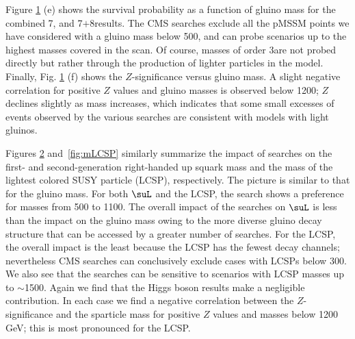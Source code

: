 \begin{figure}[t]
\vspace{1mm}
    \caption{}
    \label{fig:mg}
\end{figure}

Figure \ref{fig:mg} (e) shows the survival probability as a function of gluino mass
for the combined 7\TeV, and 7$+$8\TeV results. 
The CMS searches exclude all the pMSSM points we have considered with a gluino mass below 500\GeV, and can probe scenarios up to the highest masses covered in the scan.  Of course, masses of order 3\TeV are not probed directly but rather through the production of lighter particles in the model.   
Finally, Fig. \ref{fig:mg} (f) shows the $Z$-significance versus gluino mass.  A
slight negative correlation for positive $Z$ values and gluino masses
is observed below 1200\GeV; $Z$ declines slightly as mass
increases, which indicates that some small excesses of events observed by the various searches are consistent with models with light gluinos.  


Figures \ref{fig:mq} and~\ref{fig:mLCSP} similarly summarize the impact
of searches on the first- and second-generation right-handed up squark mass and the mass of the lightest colored SUSY particle (LCSP), respectively.  The picture is similar to that for the gluino mass.  For both $\suL$ and the LCSP, the \MTtwo{} search shows a preference for masses from 500 to 1100\GeV.  The overall impact of the searches on $\suL$ is less than the impact on the gluino mass owing to the more diverse gluino decay structure that can be accessed by a greater number of searches.  For the LCSP, the overall impact is the least  because the LCSP has the fewest decay channels; nevertheless CMS searches can conclusively exclude cases with LCSPs below 300\GeV.  We also see that the searches can be sensitive to scenarios with LCSP masses up to $\sim$1500\GeV.  Again we find that the
Higgs boson results  make a negligible contribution. In each case we find a negative correlation between the $Z$-significance and the sparticle mass for positive $Z$ values and masses below 1200 GeV; this is most pronounced for the LCSP.

\begin{figure}[t]
    \vspace{1mm}
    \caption{}
    \label{fig:mq}
\end{figure}


